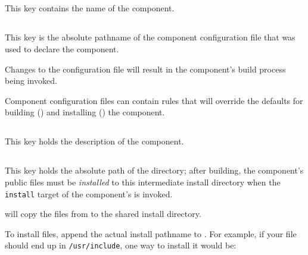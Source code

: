 
\subsection{}\label{variables:component}

This key contains the name of the component.


\subsection{}\label{variables:configuration-file}

This key is the absolute pathname of the component configuration file
that was used to declare the component.

Changes to the configuration file will result in the component's build
process being invoked.

Component configuration files can contain \makefile rules that will
override the defaults for building
() and installing
() the component.


\subsection{}\label{variables:description}

This key holds the description of the component.


\subsection{}\label{variables:destdir-directory}

This key holds the absolute path of the \destdir directory; after
building, the component's public files must be \emph{installed} to this
intermediate install directory when the \texttt{install} target of the
component's \makefile is invoked.

\lmsbw will copy the files from \destdir to the shared install directory.

To install files, append the actual install pathname to \destdir.  For
example, if your file should end up in \texttt{/usr/include}, one way
to install it would be:

